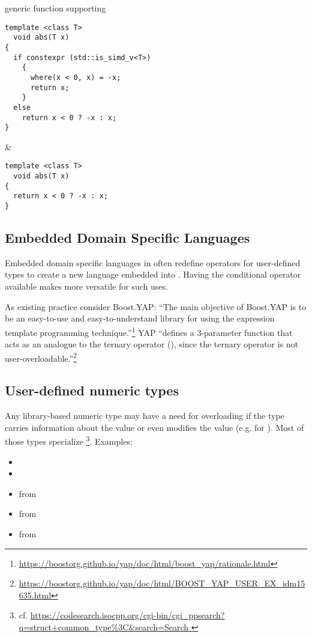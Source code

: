 \begin{tonytable}
{generic  function supporting }
\begin{lstlisting}[style=Vc]
template <class T>
  void abs(T x)
{
  if constexpr (std::is_simd_v<T>)
    {
      where(x < 0, x) = -x;
      return x;
    }
  else
    return x < 0 ? -x : x;
}
\end{lstlisting}
&
\begin{lstlisting}[style=Vc]
template <class T>
  void abs(T x)
{
  return x < 0 ? -x : x;
}
\end{lstlisting}
\end{tonytable}

\subsection{Embedded Domain Specific Languages}
Embedded domain specific languages in \CC{} often redefine operators for user-defined types to create a new language embedded into \CC{}.
Having the conditional operator available makes \CC{} more versatile for such uses.

As existing practice consider Boost.YAP:
“The main objective of Boost.YAP is to be an easy-to-use and easy-to-understand library for using the expression template programming technique.”\footnote{\url{https://boostorg.github.io/yap/doc/html/boost_yap/rationale.html}}
YAP “defines a 3-parameter function  that acts as an analogue to the ternary operator (), since the ternary operator is not user-overloadable.”\footnote{\url{https://boostorg.github.io/yap/doc/html/BOOST_YAP_USER_EX_idm15635.html}}

\subsection{User-defined numeric types}
Any library-based numeric type may have a need for overloading  if the type carries information about the value or even modifies the value (e.g. for ).
Most of those types specialize \footnote{cf. \url{https://codesearch.isocpp.org/cgi-bin/cgi_ppsearch?q=struct+common_type\%3C&search=Search
}}.
Examples:
\begin{itemize}
  \item {}
  \item {}
  \item {} from \cite{P1050R0}
  \item {} from \cite{P0037R5}
  \item {} from \cite{site.bounded-integer}
\end{itemize}

